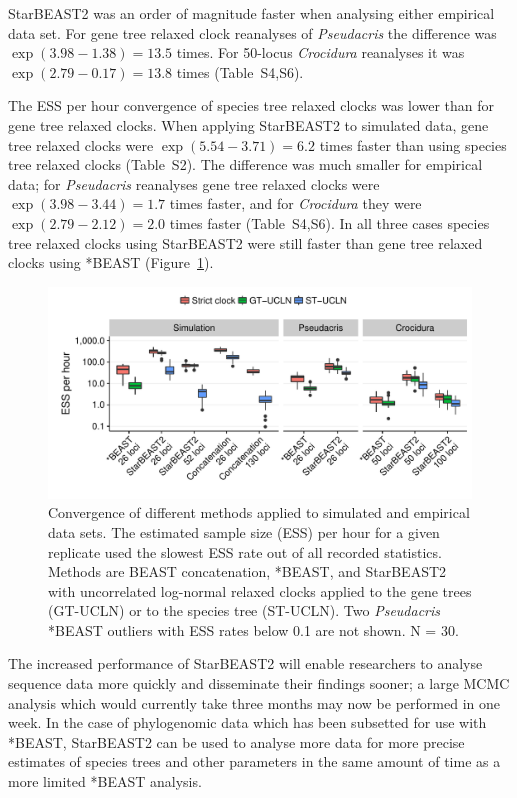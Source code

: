 \documentclass[12pt]{article}
\begin{document}
StarBEAST2 was an order of magnitude faster when analysing either
empirical data set. For gene tree relaxed clock reanalyses of
\textit{Pseudacris} the difference was $\exp(3.98 - 1.38) = 13.5$ times. For
50-locus \textit{Crocidura} reanalyses it was $\exp(2.79 - 0.17) = 13.8$ times
(Table~S4,S6).

The ESS per hour convergence of species tree relaxed clocks was lower than for
gene tree relaxed clocks. When applying StarBEAST2 to simulated data, gene tree relaxed clocks were
$\exp(5.54 - 3.71) = 6.2$ times faster than using species tree relaxed clocks (Table~S2). The difference was much smaller for empirical data;
for \textit{Pseudacris} reanalyses gene tree relaxed clocks were $\exp(3.98 -
3.44) = 1.7$ times faster, and for \textit{Crocidura} they were $\exp(2.79 -
2.12) = 2.0$ times faster (Table~S4,S6). In all three cases species tree relaxed clocks
using StarBEAST2 were still faster than gene tree relaxed clocks using *BEAST
(Figure~\ref{fig:essPerHourComparison}).

\begin{figure}[htb!]
\centering
\includegraphics[width=130mm]{minimum-ess_per_hour-comparison.pdf}
\caption
{Convergence of different methods applied to simulated and empirical data
sets. The estimated sample size (ESS) per hour for a given replicate used the
slowest ESS rate out of all recorded statistics. Methods are BEAST
concatenation, *BEAST, and StarBEAST2 with uncorrelated log-normal relaxed
clocks applied to the gene trees (GT-UCLN) or to the species tree (ST-UCLN).
Two \textit{Pseudacris} *BEAST outliers with ESS rates below 0.1
are not shown.  N = 30.}
\label{fig:essPerHourComparison}
\end{figure}

The increased performance of StarBEAST2 will enable researchers to analyse
sequence data more quickly and disseminate their findings sooner; a large MCMC
analysis which would currently take three months may now be performed in one
week. In the case of phylogenomic data which has been subsetted for use with
*BEAST, StarBEAST2 can be used to analyse more data for more
precise estimates of species trees and other parameters in the same amount of
time as a more limited *BEAST analysis.
\end{document}
